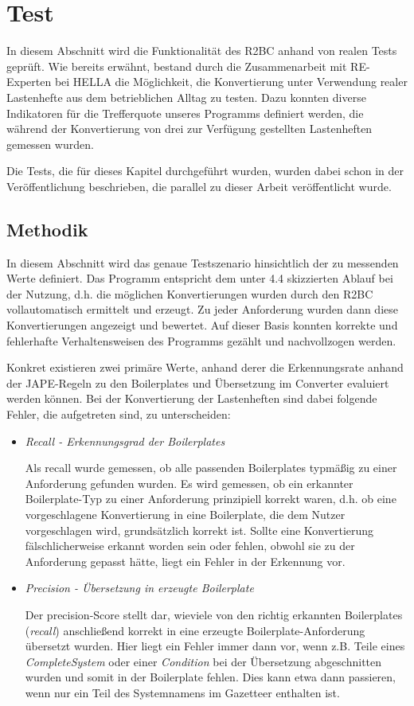 \documentclass[12pt]{report}
\begin{document}
\section{Test}
In diesem Abschnitt wird die Funktionalität des R2BC anhand von realen Tests geprüft. Wie bereits erwähnt, bestand durch die Zusammenarbeit mit RE-Experten bei HELLA die Möglichkeit, die Konvertierung unter Verwendung realer Lastenhefte aus dem betrieblichen Alltag zu testen. Dazu konnten diverse Indikatoren für die Trefferquote unseres Programms definiert werden, die während der Konvertierung von drei zur Verfügung gestellten Lastenheften gemessen wurden.

Die Tests, die für dieses Kapitel durchgeführt wurden, wurden dabei schon in der Veröffentlichung \cite{zh19} beschrieben, die parallel zu dieser Arbeit veröffentlicht wurde.

\subsection{Methodik}
In diesem Abschnitt wird das genaue Testszenario hinsichtlich der zu messenden Werte definiert. Das Programm entspricht dem unter 4.4 skizzierten Ablauf bei der Nutzung, d.h. die möglichen Konvertierungen wurden durch den R2BC vollautomatisch ermittelt und erzeugt. Zu jeder Anforderung wurden dann diese Konvertierungen angezeigt und bewertet. Auf dieser Basis konnten korrekte und fehlerhafte Verhaltensweisen des Programms gezählt und nachvollzogen werden.

Konkret existieren zwei primäre Werte, anhand derer die Erkennungsrate anhand der JAPE-Regeln zu den Boilerplates und Übersetzung im Converter evaluiert werden können. Bei der Konvertierung der Lastenheften sind dabei folgende Fehler, die aufgetreten sind, zu unterscheiden:
\begin{itemize}
\item \textit{Recall - Erkennungsgrad der Boilerplates} 

Als recall wurde gemessen, ob alle passenden Boilerplates typmäßig zu einer Anforderung gefunden wurden. Es wird gemessen, ob ein erkannter Boilerplate-Typ zu einer Anforderung prinzipiell korrekt waren, d.h. ob eine vorgeschlagene Konvertierung in eine Boilerplate, die dem Nutzer vorgeschlagen wird, grundsätzlich korrekt ist. Sollte eine Konvertierung fälschlicherweise erkannt worden sein oder fehlen, obwohl sie zu der Anforderung gepasst hätte, liegt ein Fehler in der Erkennung vor.

\item \textit{Precision - Übersetzung in erzeugte Boilerplate} 

Der precision-Score stellt dar, wieviele von den richtig erkannten Boilerplates (\textit{recall}) anschließend korrekt in eine erzeugte Boilerplate-Anforderung übersetzt wurden. Hier liegt ein Fehler immer dann vor, wenn z.B. Teile eines \textit{CompleteSystem} oder einer \textit{Condition} bei der Übersetzung abgeschnitten wurden und somit in der Boilerplate fehlen. Dies kann etwa dann passieren, wenn nur ein Teil des Systemnamens im Gazetteer enthalten ist. 
\end{itemize}
\end{document}
